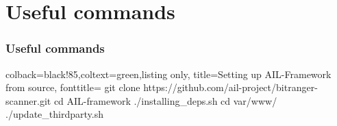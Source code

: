 
\begin{frame}[t,plain]
\end{frame}

\section{Useful commands}
\begin{frame}
\frametitle{Useful commands}

\begin{tcblisting}{colback=black!85,coltext=green,listing only, title=Setting up AIL-Framework from source, fonttitle=\bfseries}
git clone https://github.com/ail-project/bitranger-scanner.git
cd AIL-framework
./installing_deps.sh
cd var/www/
./update_thirdparty.sh
\end{tcblisting}

%
%
%

\end{frame}
